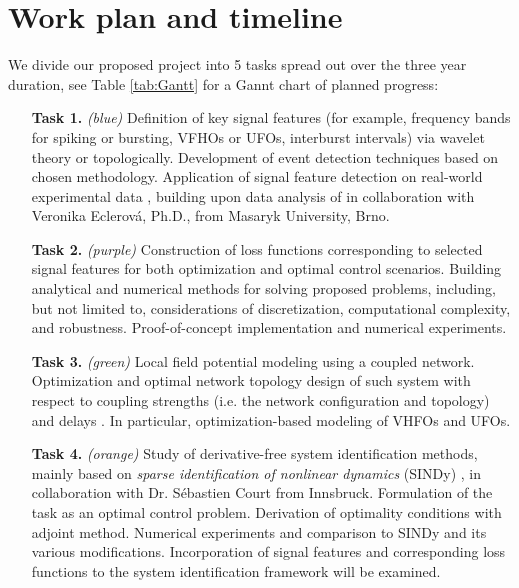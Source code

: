 \documentclass[a4paper,11pt]{scrartcl}
\begin{document}
\section{Work plan and timeline}\label{sec:workplan}


We divide our proposed project into 5 tasks spread out over the three year duration, see Table \ref{tab:Gantt} for a Gannt chart of planned progress:

\begin{itemize}
    \item[\textbf{Task 1.}] \textit{(blue)} Definition of key signal features (for example, frequency bands for spiking or bursting, VFHOs or UFOs, interburst intervals) via wavelet theory or topologically. Development of event detection techniques based on chosen methodology. Application of signal feature detection on real-world experimental data \cite{Brazdil2017}, building upon data analysis of \cite{Halastova2025} in collaboration with Veronika Eclerová, Ph.D., from Masaryk University, Brno.
    
    \item[\textbf{Task 2.}] \textit{(purple)} Construction of loss functions corresponding to selected signal features for both optimization and optimal control scenarios. Building analytical and numerical methods for solving proposed problems, including, but not limited to, considerations of discretization, computational complexity, and robustness. Proof-of-concept implementation and numerical experiments.

    \item[\textbf{Task 3.}] \textit{(green)} Local field potential modeling using a coupled network. Optimization and optimal network topology design of such system with respect to coupling strengths (i.e. the network configuration and topology) and delays \cite{Ritschel2024, Boccia2016}. In particular, optimization-based modeling of VHFOs and UFOs.

    \item[\textbf{Task 4.}] \textit{(orange)} Study of derivative-free system identification methods, mainly based on \textit{sparse identification of nonlinear dynamics} (SINDy) \cite{Brunton2016}, in collaboration with Dr. Sébastien Court from Innsbruck. Formulation of the task as an optimal control problem. Derivation of optimality conditions with adjoint method. Numerical experiments and comparison to SINDy and its various modifications. Incorporation of signal features and corresponding loss functions to the system identification framework will be examined.


\end{itemize}
\end{document}
